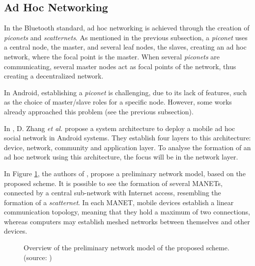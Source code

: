 \subsection{Ad Hoc Networking}

In the Bluetooth standard, ad hoc networking is achieved through the creation of \textit{piconets} and \textit{scatternets}. As mentioned in the previous subsection, a \textit{piconet} uses a central node, the master, and several leaf nodes, the slaves, creating an ad hoc network, where the focal point is the master. When several \textit{piconets} are communicating, several master nodes act as focal points of the network, thus creating a decentralized network.

In Android, establishing a \textit{piconet} is challenging, due to its lack of features, such as the choice of master/slave roles for a specific node. However, some works already approached this problem (see the previous subsection).

In \cite{basa}, D. Zhang \textit{et al.} propose a system architecture to deploy a mobile ad hoc social network in Android systems. They establish four layers to this architecture: device, network, community and application layer. To analyse the formation of an ad hoc network using this architecture, the focus will be in the network layer.

In Figure \ref{fig:basanet}, the authors of \cite{basa}, propose a preliminary network model, based on the proposed scheme. It is possible to see the formation of several \glspl{MANET}, connected by a central sub-network with Internet access, resembling the formation of a \textit{scatternet}. In each \gls{MANET}, mobile devices establish a linear communication topology, meaning that they hold a maximum of two connections, whereas computers may establish meshed networks between themselves and other devices.

\begin{figure}[ht]
	\noindent{}
	\caption{\label{fig:basanet} Overview of the preliminary network model of the proposed scheme. (source: \cite{basa})}
\end{figure}

